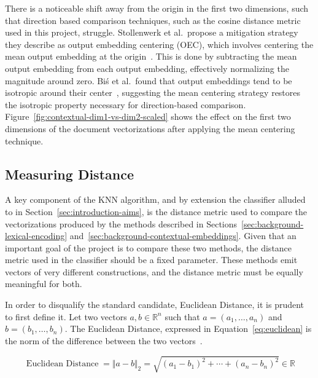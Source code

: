 \documentclass[11pt]{article}
\theoremstyle{plain}
\theoremstyle{definition}
\begin{document}
There is a noticeable shift away from the origin in the first two dimensions, such that direction based comparison techniques, such as the cosine distance metric used in this project, struggle. Stollenwerk et al.\ propose a mitigation strategy they describe as output embedding centering (OEC), which involves centering the mean output embedding at the origin~\cite{stollenwerk/2026/output}. This is done by subtracting the mean output embedding from each output embedding, effectively normalizing the magnitude around zero. Biś et al.\ found that output embeddings tend to be isotropic around their center~\cite{bis/2021/much}, suggesting the mean centering strategy restores the isotropic property necessary for direction-based comparison. Figure~\ref{fig:contextual-dim1-vs-dim2-scaled} shows the effect on the first two dimensions of the document vectorizations after applying the mean centering technique.

\subsection{Measuring Distance}\label{sec:distance}

A key component of the KNN algorithm, and by extension the classifier alluded to in Section~\ref{sec:introduction-aims}, is the distance metric used to compare the vectorizations produced by the methods described in Sections~\ref{sec:background-lexical-encoding} and~\ref{sec:background-contextual-embeddings}. Given that an important goal of the project is to compare these two methods, the distance metric used in the classifier should be a fixed parameter. These methods emit vectors of very different constructions, and the distance metric must be equally meaningful for both.

In order to disqualify the standard candidate, Euclidean Distance, it is prudent to first define it. Let two vectors $a, b \in \mathbb{R}^{n}$ such that $a = (a_1, \dots, a_n)$ and $b = (b_1, \dots, b_n)$. The Euclidean Distance, expressed in Equation~\ref{eq:euclidean} is the norm of the difference between the two vectors~\cite{lay/2021/linear}.

\begin{equation}\label{eq:euclidean}
    \operatorname{Euclidean\ Distance} = {\Vert a-b \Vert}_2 = \sqrt{{(a_1-b_1)}^2 + \cdots + {(a_n - b_n)}^2} \in \mathbb{R}
\end{equation}
\end{document}
